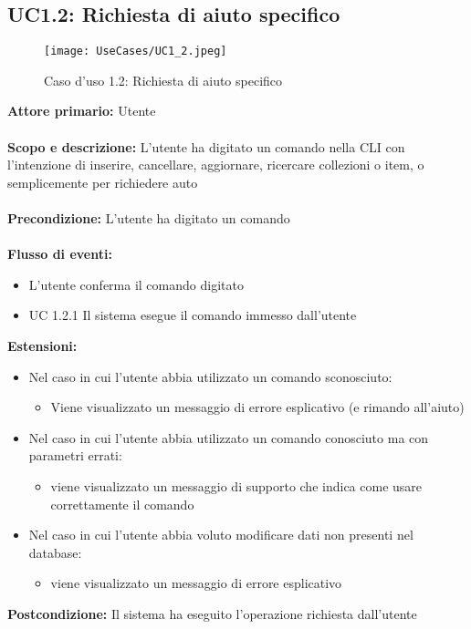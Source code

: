 \documentclass{scalatekids-article}
\begin{document}
\subsection{UC1.2: Richiesta di aiuto specifico}
\begin{figure}[H]
  \texttt{[image: UseCases/UC1\_2.jpeg]}
  \caption{Caso d'uso 1.2: Richiesta di aiuto specifico}
\end{figure}
\textbf{Attore primario:} Utente \\ \\
\textbf{Scopo e descrizione:}  L’utente ha digitato un comando nella CLI con l’intenzione di inserire, cancellare, aggiornare, ricercare collezioni o item, o semplicemente per richiedere auto\\ \\
\textbf{Precondizione:} L’utente ha digitato un comando\\ \\
\textbf{Flusso di eventi:}
\begin{itemize}
\item L’utente conferma il comando digitato
\item UC 1.2.1 Il sistema esegue il comando immesso dall’utente
\end{itemize}
\textbf{Estensioni:}
\begin{itemize}
\item Nel caso in cui l’utente abbia utilizzato un comando sconosciuto:
  \begin{itemize}
  \item Viene visualizzato un messaggio di errore esplicativo (e rimando all'aiuto)
  \end{itemize}
\item Nel caso in cui l’utente abbia utilizzato un comando conosciuto ma con parametri errati:
  \begin{itemize}
  \item viene visualizzato un messaggio di supporto che indica come usare correttamente il comando
  \end{itemize}
\item Nel caso in cui l’utente abbia voluto modificare dati non presenti nel database:
  \begin{itemize}
  \item viene visualizzato un messaggio di errore esplicativo
  \end{itemize}
\end{itemize}
\textbf{Postcondizione:} Il sistema ha eseguito l’operazione richiesta dall’utente
\end{document}
